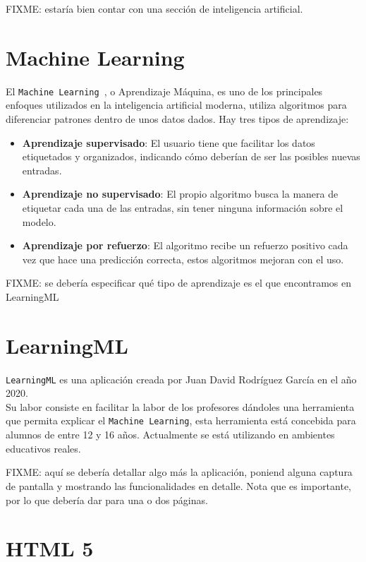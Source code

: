 \documentclass[a4paper, 12pt]{book}
\begin{document}
FIXME: estaría bien contar con una sección de inteligencia artificial.

\section{Machine Learning}
\label{sec:machine-learning}

El \texttt{Machine Learning}~\cite{rouhiainen2018inteligencia}, o Aprendizaje Máquina, es uno de los principales enfoques utilizados en la inteligencia artificial moderna, utiliza algoritmos para diferenciar patrones dentro de unos datos dados. Hay tres tipos de aprendizaje:

\begin{itemize}
	\item \textbf{Aprendizaje supervisado}: El usuario tiene que facilitar los datos etiquetados y organizados, indicando cómo deberían de ser las posibles nuevas entradas.
	\item \textbf{Aprendizaje no supervisado}: El propio algoritmo busca la manera de etiquetar cada una de las entradas, sin tener ninguna información sobre el modelo.
	\item \textbf{Aprendizaje por refuerzo}: El algoritmo recibe un refuerzo positivo cada vez que hace una predicción correcta, estos algoritmos mejoran con el uso.
\end{itemize}

FIXME: se debería especificar qué tipo de aprendizaje es el que encontramos en LearningML

\section{LearningML}
\label{sec:learningml}

\texttt{LearningML} es una aplicación creada por Juan David Rodríguez García en el año 2020.\\
Su labor consiste en facilitar la labor de los profesores dándoles una herramienta que permita explicar el \texttt{Machine Learning}, esta herramienta está concebida para alumnos de entre 12 y 16 años. Actualmente se está utilizando en ambientes educativos reales.

FIXME: aquí se debería detallar algo más la aplicación, poniend alguna captura de pantalla y mostrando las funcionalidades en detalle. Nota que es importante, por lo que debería dar para una o dos páginas.


\section{HTML 5} 
\label{sec:html5}
\end{document}
